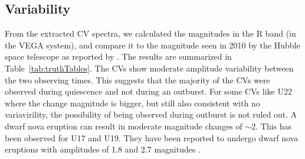 \subsection{Variability}

From the extracted CV spectra, we calculated the magnitudes in the R band (in the VEGA system), and compare it to the magnitude seen in 2010 by the Hubble space telescope as reported by \cite{cohn_identification_2010}. The results are summarized in Table~\ref{tab:truthTables}. The CVs show moderate amplitude variability between the two observing times. This suggests that the majority of the CVs were observed during quiescence and not during an outburst. For some CVs like U22 where the change magnitude is bigger, but still also consistent with no variavirility, the possibility of being observed during outburst is not ruled out. A dwarf nova eruption can result in moderate magnitude changes of $\sim 2$. This has been observed for U17 and U19. They have been reported to undergo dwarf nova eruptions with amplitudes of 1.8 and 2.7 magnitudes \citep{shara_erupting_2005}. 

